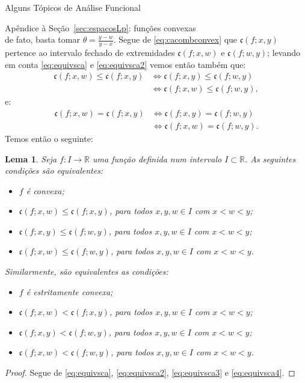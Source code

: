 \documentclass[oneside,final,11pt]{amsbook}
\newcommand{\R}{\mathds R}
\newcommand{\ca}{\mathfrak c}
\theoremstyle{remark}\newtheorem{exercise}{Exercício}[chapter]
\theoremstyle{remark}\newtheorem{*exercise}[exercise]{\hbox to 0pt{\hskip 0pt minus 1fil*}Exercício}
\theoremstyle{definition}\newtheorem{exdefin}{Definição}[chapter]
\theoremstyle{plain}\newtheorem{teo}{Teorema}[section]
\theoremstyle{plain}\newtheorem{lem}[teo]{Lema}
\theoremstyle{plain}\newtheorem{prop}[teo]{Proposição}
\theoremstyle{plain}\newtheorem{cor}[teo]{Corolário}
\theoremstyle{definition}\newtheorem{defin}[teo]{Definição}
\theoremstyle{remark}\newtheorem{rem}[teo]{Observação}
\theoremstyle{definition}\newtheorem{notation}[teo]{Notação}
\theoremstyle{definition}\newtheorem{convention}[teo]{Convenção}
\theoremstyle{definition}\newtheorem{example}[teo]{Exemplo}
\numberwithin{section}{chapter}
\numberwithin{equation}{section}
\begin{document}
\begin{chapter}{Alguns Tópicos de Análise Funcional}
\begin{section}{Apêndice à Seção~\ref{sec:espacosLp}: funções convexas}
\begin{equation}
\end{equation}
de fato, basta tomar $\theta=\frac{y-w}{y-x}$. Segue de \eqref{eq:cacombconvex} que
$\ca(f;x,y)$ pertence ao intervalo fechado de extremidades $\ca(f;x,w)$ e $\ca(f;w,y)$;
levando em conta \eqref{eq:equivsca} e \eqref{eq:equivsca2} vemos então também que:
\begin{equation}\label{eq:equivsca3}
\begin{aligned}
\ca(f;x,w)\le\ca(f;x,y)&\Longleftrightarrow\ca(f;x,y)\le\ca(f;w,y)\\
&\Longleftrightarrow\ca(f;x,w)\le\ca(f;w,y),
\end{aligned}
\end{equation}
e:
\begin{equation}\label{eq:equivsca4}
\begin{aligned}
\ca(f;x,w)=\ca(f;x,y)&\Longleftrightarrow\ca(f;x,y)=\ca(f;w,y)\\
&\Longleftrightarrow\ca(f;x,w)=\ca(f;w,y).
\end{aligned}
\end{equation}
Temos então o seguinte:
\begin{lem}\label{thm:lemasecantes}
Seja $f:I\to\R$ uma função definida num intervalo $I\subset\R$. As seguintes condições
são equivalentes:
\begin{itemize}
\item $f$ é convexa;
\item $\ca(f;x,w)\le\ca(f;x,y)$, para todos $x,y,w\in I$ com $x<w<y$;
\item $\ca(f;x,y)\le\ca(f;w,y)$, para todos $x,y,w\in I$ com $x<w<y$;
\item $\ca(f;x,w)\le\ca(f;w,y)$, para todos $x,y,w\in I$ com $x<w<y$.
\end{itemize}
Similarmente, são equivalentes as condições:
\begin{itemize}
\item $f$ é estritamente convexa;
\item $\ca(f;x,w)<\ca(f;x,y)$, para todos $x,y,w\in I$ com $x<w<y$;
\item $\ca(f;x,y)<\ca(f;w,y)$, para todos $x,y,w\in I$ com $x<w<y$;
\item $\ca(f;x,w)<\ca(f;w,y)$, para todos $x,y,w\in I$ com $x<w<y$.
\end{itemize}
\end{lem}
\begin{proof}
Segue de \eqref{eq:equivsca}, \eqref{eq:equivsca2}, \eqref{eq:equivsca3}
e \eqref{eq:equivsca4}.
\end{proof}


\end{section}
\end{chapter}
\end{document}
